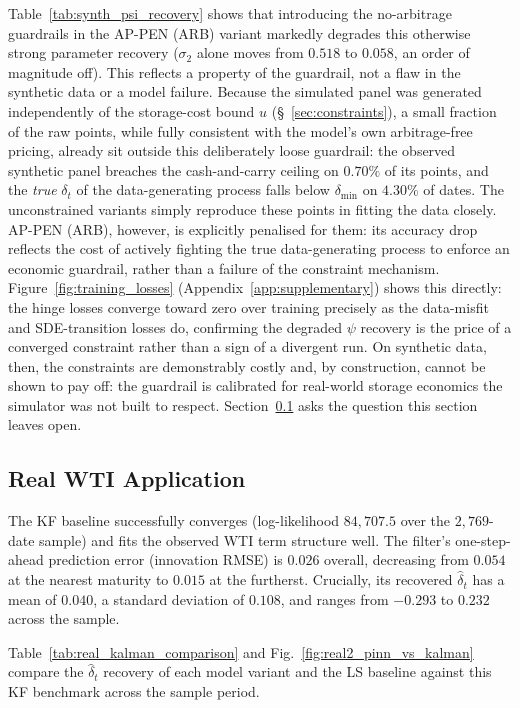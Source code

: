 \documentclass[11pt, a4paper]{article}
\begin{document}
Table~\ref{tab:synth_psi_recovery} shows that introducing the no-arbitrage guardrails in the AP-PEN (ARB) variant markedly degrades this otherwise strong parameter recovery ($\sigma_2$ alone moves from $0.518$ to $0.058$, an order of magnitude off). This reflects a property of the guardrail, not a flaw in the synthetic data or a model failure. Because the simulated panel was generated independently of the storage-cost bound $u$ (\S~\ref{sec:constraints}), a small fraction of the raw points, while fully consistent with the model's own arbitrage-free pricing, already sit outside this deliberately loose guardrail: the observed synthetic panel breaches the cash-and-carry ceiling on $0.70\%$ of its points, and the \emph{true} $\delta_t$ of the data-generating process falls below $\delta_{\min}$ on $4.30\%$ of dates. The unconstrained variants simply reproduce these points in fitting the data closely. AP-PEN (ARB), however, is explicitly penalised for them: its accuracy drop reflects the cost of actively fighting the true data-generating process to enforce an economic guardrail, rather than a failure of the constraint mechanism. Figure~\ref{fig:training_losses} (Appendix~\ref{app:supplementary}) shows this directly: the hinge losses converge toward zero over training precisely as the data-misfit and SDE-transition losses do, confirming the degraded $\psi$ recovery is the price of a converged constraint rather than a sign of a divergent run. On synthetic data, then, the constraints are demonstrably costly and, by construction, cannot be shown to pay off: the guardrail is calibrated for real-world storage economics the simulator was not built to respect. Section~\ref{sec:real_data} asks the question this section leaves open.


\subsection{Real WTI Application}
\label{sec:real_data}
The KF baseline successfully converges (log-likelihood $84{,}707.5$ over the $2{,}769$-date sample) and fits the observed WTI term structure well. The filter's one-step-ahead prediction error (innovation RMSE) is $0.026$ overall, decreasing from $0.054$ at the nearest maturity to $0.015$ at the furtherst. Crucially, its recovered $\hat\delta_t$ has a mean of $0.040$, a standard deviation of $0.108$, and ranges from $-0.293$ to $0.232$ across the sample.

Table~\ref{tab:real_kalman_comparison} and Fig.~\ref{fig:real2_pinn_vs_kalman} compare the $\hat{\delta}_t$ recovery of each model variant and the LS baseline against this KF benchmark across the sample period.
\end{document}
